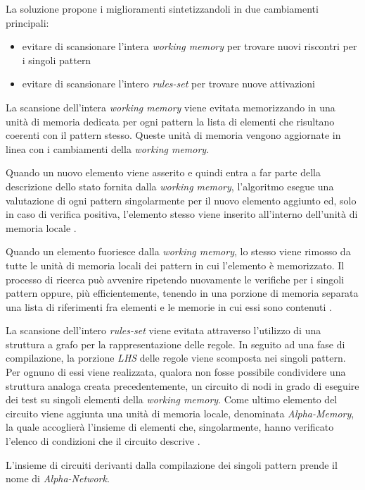 La soluzione propone i miglioramenti sintetizzandoli in due cambiamenti principali:
\begin{itemize}
	\item evitare di scansionare l'intera \emph{working memory} per trovare nuovi riscontri per i singoli pattern
	\item evitare di scansionare l'intero \emph{rules-set} per trovare nuove attivazioni
\end{itemize}

La scansione dell'intera \emph{working memory} viene evitata memorizzando in una unità di memoria dedicata per ogni pattern la lista di elementi che risultano coerenti con il pattern stesso. Queste unità di memoria vengono aggiornate in linea con i cambiamenti della \emph{working memory}.

Quando un nuovo elemento viene asserito e quindi entra a far parte della descrizione dello stato fornita dalla \emph{working memory}, l'algoritmo esegue una valutazione di ogni pattern singolarmente per il nuovo elemento aggiunto ed, solo in caso di verifica positiva, l'elemento stesso viene inserito all'interno dell'unità di memoria locale \cite{forgy1982}.

Quando un elemento fuoriesce dalla \emph{working memory}, lo stesso viene rimosso da tutte le unità di memoria locali dei pattern in cui l'elemento è memorizzato. Il processo di ricerca può avvenire ripetendo nuovamente le verifiche per i singoli pattern \cite{forgy1982} oppure, più efficientemente, tenendo in una porzione di memoria separata una lista di riferimenti fra elementi e le memorie in cui essi sono contenuti \cite{Doorenbos95productionmatching}.

La scansione dell'intero \emph{rules-set} viene evitata attraverso l'utilizzo di una struttura a grafo per la rappresentazione delle regole. In seguito ad una fase di compilazione, la porzione \emph{LHS} delle regole viene scomposta nei singoli pattern. Per ognuno di essi viene realizzata, qualora non fosse possibile condividere una struttura analoga creata precedentemente, un circuito di nodi in grado di eseguire dei test su singoli elementi della \emph{working memory}. Come ultimo elemento del circuito viene aggiunta una unità di memoria locale, denominata \emph{Alpha-Memory}, la quale accoglierà l'insieme di elementi che, singolarmente, hanno verificato l'elenco di condizioni che il circuito descrive \cite{Doorenbos95productionmatching}.

L'insieme di circuiti derivanti dalla compilazione dei singoli pattern prende il nome di \emph{Alpha-Network}.

